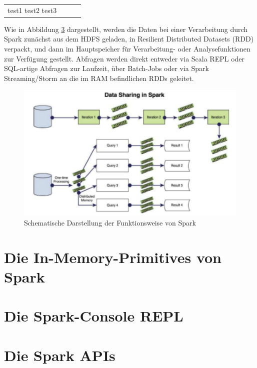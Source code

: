 \begin{tabular}{ l l c | r |}
\hline
test1 test2 test3
\end{tabular}


Wie in Abbildung \ref{section:rdd} dargestellt, werden die Daten bei einer Verarbeitung durch Spark zunächst aus dem HDFS geladen, in Resilient Distributed Datasets (RDD) verpackt, und dann im Hauptspeicher für Verarbeitung- oder Analysefunktionen zur Verfügung gestellt. Abfragen werden direkt entweder via Scala REPL oder SQL-artige Abfragen zur Laufzeit, über Batch-Jobs oder via Spark Streaming/Storm an die im RAM befindlichen RDDs geleitet.

\begin{figure}[htb!]
\centering
\includegraphics[width=1.0\textwidth]{bilder/3_spark.png}
\caption{Schematische Darstellung der Funktionsweise von Spark \protect{}}
\label{fig:sparkfunkt}
\end{figure}



\section{Die In-Memory-Primitives von Spark}
\label{section:rdd}


\section{Die Spark-Console REPL}
\label{section:rdd}


\section{Die Spark APIs}
\label{section:rdd}


























